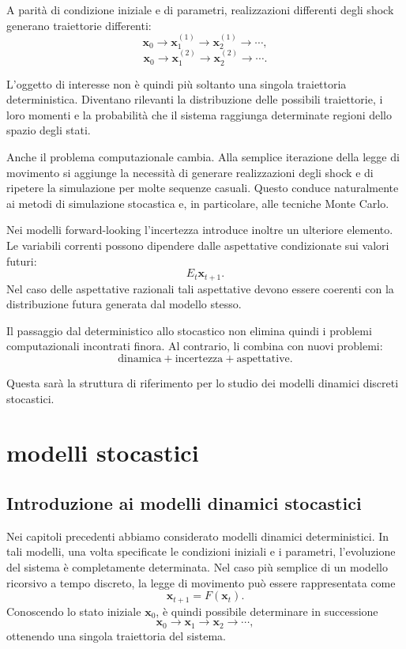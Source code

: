 \documentclass{book}
\begin{document}
A parità di condizione iniziale e di parametri, realizzazioni differenti
degli shock generano traiettorie differenti:
\[
\mathbf{x}_0
\rightarrow
\mathbf{x}_1^{(1)}
\rightarrow
\mathbf{x}_2^{(1)}
\rightarrow\cdots,
\]
\[
\mathbf{x}_0
\rightarrow
\mathbf{x}_1^{(2)}
\rightarrow
\mathbf{x}_2^{(2)}
\rightarrow\cdots.
\]

L'oggetto di interesse non è quindi più soltanto una singola traiettoria
deterministica. Diventano rilevanti la distribuzione delle possibili
traiettorie, i loro momenti e la probabilità che il sistema raggiunga
determinate regioni dello spazio degli stati.

Anche il problema computazionale cambia. Alla semplice iterazione della
legge di movimento si aggiunge la necessità di generare realizzazioni
degli shock e di ripetere la simulazione per molte sequenze casuali.
Questo conduce naturalmente ai metodi di simulazione stocastica e,
in particolare, alle tecniche Monte Carlo.

Nei modelli forward-looking l'incertezza introduce inoltre un ulteriore
elemento. Le variabili correnti possono dipendere dalle aspettative
condizionate sui valori futuri:
\[
E_t\mathbf{x}_{t+1}.
\]
Nel caso delle aspettative razionali tali aspettative devono essere
coerenti con la distribuzione futura generata dal modello stesso.

Il passaggio dal deterministico allo stocastico non elimina quindi i
problemi computazionali incontrati finora. Al contrario, li combina con
nuovi problemi:
\[
\text{dinamica}
+
\text{incertezza}
+
\text{aspettative}.
\]

Questa sarà la struttura di riferimento per lo studio dei modelli
dinamici discreti stocastici.


\chapter{modelli stocastici}

\section{Introduzione ai modelli dinamici stocastici}

Nei capitoli precedenti abbiamo considerato modelli dinamici deterministici. In tali modelli, una volta specificate le condizioni iniziali e i parametri, l'evoluzione del sistema è completamente determinata. Nel caso più semplice di un modello ricorsivo a tempo discreto, la legge di movimento può essere rappresentata come
\[
\mathbf{x}_{t+1}=F(\mathbf{x}_t).
\]
Conoscendo lo stato iniziale $\mathbf{x}_0$, è quindi possibile determinare in successione
\[
\mathbf{x}_0\rightarrow\mathbf{x}_1\rightarrow
\mathbf{x}_2\rightarrow\cdots,
\]
ottenendo una singola traiettoria del sistema.
\end{document}
